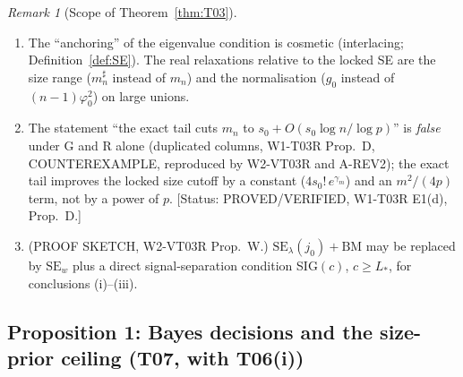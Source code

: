 \documentclass[11pt]{article}
\theoremstyle{definition}
\theoremstyle{remark}
\newtheorem{remark}{Remark}
\begin{document}
\begin{remark}[Scope of Theorem~\ref{thm:T03}]\label{rem:T03}
\begin{enumerate}
\item The ``anchoring'' of the eigenvalue condition is cosmetic (interlacing; Definition~\ref{def:SE}). The real
relaxations relative to the locked SE are the size range ($m^\sharp_n$ instead of $m_n$) and the normalisation ($g_0$
instead of $(n-1)\varphi_0^2$) on large unions.
\item The statement ``the exact tail cuts $m_n$ to $s_0+O(s_0\log n/\log p)$'' is \emph{false} under G and R alone
(duplicated columns, W1-T03R Prop.~D, COUNTEREXAMPLE, reproduced by W2-VT03R and A-REV2); the exact tail improves the
locked size cutoff by a constant ($4s_0!\,e^{\gamma_m}$) and an $m^2/(4p)$ term, not by a power of $p$. [Status: PROVED/VERIFIED, W1-T03R E1(d), Prop.~D.]
\item (PROOF SKETCH, W2-VT03R Prop.~W.) $\mathrm{SE}_\lambda(j_0)+\mathrm{BM}$ may be replaced by $\mathrm{SE}_w$ plus a direct
signal-separation condition SIG$(c)$, $c\ge L_*$, for conclusions (i)--(iii).
\end{enumerate}
\end{remark}

\subsection{Proposition 1: Bayes decisions and the size-prior ceiling (T07, with T06(i))}
\end{document}
